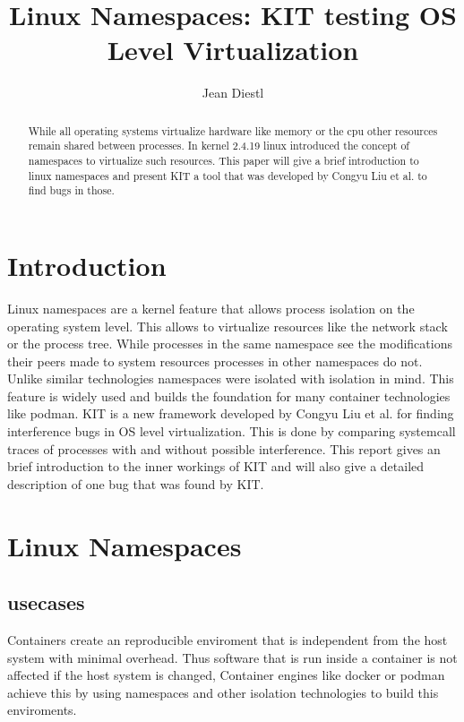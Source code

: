 \documentclass[10pt,twocolumn,a4paper]{article}
\author{Jean Diestl}
\begin{document}
\title{Linux Namespaces: KIT testing OS Level Virtualization}

\newcommand{\todo}[1]{{\texttt{[#1]}}}
\newcommand{\code}[1]{{\tt \small{#1}}}

\maketitle

\begin{abstract}
While all operating systems virtualize hardware like memory or the cpu other resources remain shared between processes.
In kernel 2.4.19 linux introduced the concept of namespaces to virtualize such resources. This paper will give a brief 
introduction to linux namespaces and present KIT a tool that was developed by Congyu Liu et al. to
find bugs in those.
\end{abstract}

\section{Introduction}\label{sec:introduction}
Linux namespaces are a kernel feature that allows process isolation on the operating system level.
This allows to virtualize resources like the network stack or the process tree.
While processes in the same namespace see the modifications their peers made to system resources
processes in other namespaces do not. Unlike similar technologies namespaces were isolated with
isolation in mind. 
This feature is widely used and builds the foundation for many container technologies like podman.
KIT is a new framework developed by Congyu Liu et al. for finding interference bugs in OS level virtualization\cite{0}. 
This is done by comparing systemcall traces of processes with and without possible interference.
This report gives an brief introduction to the inner
workings of  KIT and will also give a detailed description of one bug
that was found by KIT. 

\section{Linux Namespaces}\label{sec:background}

\subsection{usecases}
Containers create an reproducible enviroment that is independent from the host system with minimal overhead.
Thus software that is run inside a container is not affected if the host system is changed, 
Container engines like docker or podman achieve this by using namespaces and other isolation technologies to build this enviroments.
\end{document}
